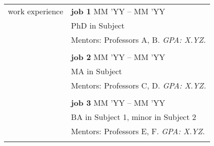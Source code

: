 \documentclass[letterpaper, 10pt]{article} %
\begin{document}
\begin{longtable}{p{1in}p{4in}}


{work experience}
& \textbf{job 1} \hfill MM 'YY – MM 'YY \\
& PhD in Subject \hfill \\
& Mentors: Professors A, B. {\it GPA: X.YZ.}\\
& \\

& \textbf{job 2} \hfill MM 'YY – MM 'YY \\
& MA in Subject \hfill \\
& Mentors: Professors C, D. {\it GPA: X.YZ.}\\
& \\

& \textbf{job 3} \hfill MM 'YY – MM 'YY\\
& BA in Subject 1, minor in Subject 2 \hfill \\
& Mentors: Professors E, F. {\it GPA: X.YZ.}\\
& \\


\end{longtable}
\end{document}

